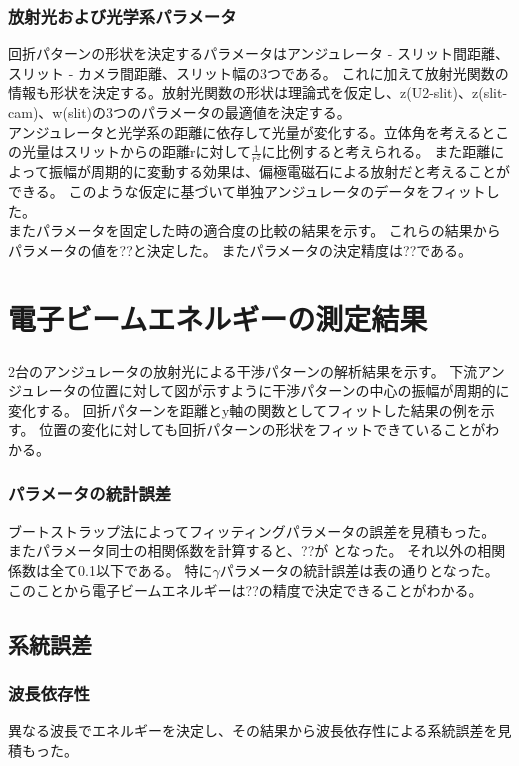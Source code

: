 \documentclass[a4paper,11pt,uplatex]{jsbook}
\begin{document}
\subsubsection{放射光および光学系パラメータ}
回折パターンの形状を決定するパラメータはアンジュレータ - スリット間距離、スリット - カメラ間距離、スリット幅の3つである。
これに加えて放射光関数の情報も形状を決定する。放射光関数の形状は理論式を仮定し、z(U2-slit)、z(slit-cam)、w(slit)の3つのパラメータの最適値を決定する。\\
アンジュレータと光学系の距離に依存して光量が変化する。立体角を考えるとこの光量はスリットからの距離rに対して$\frac{1}{r^2}$に比例すると考えられる。
また距離によって振幅が周期的に変動する効果は、偏極電磁石による放射だと考えることができる。
このような仮定に基づいて単独アンジュレータのデータをフィットした。\\
またパラメータを固定した時の適合度の比較の結果を示す。
これらの結果からパラメータの値を??と決定した。
またパラメータの決定精度は??である。
\section{電子ビームエネルギーの測定結果}
\subsubsection{}
2台のアンジュレータの放射光による干渉パターンの解析結果を示す。
下流アンジュレータの位置に対して図が示すように干渉パターンの中心の振幅が周期的に変化する。
回折パターンを距離とy軸の関数としてフィットした結果の例を示す。
位置の変化に対しても回折パターンの形状をフィットできていることがわかる。
\subsubsection{パラメータの統計誤差}
ブートストラップ法によってフィッティングパラメータの誤差を見積もった。
またパラメータ同士の相関係数を計算すると、??が となった。
それ以外の相関係数は全て0.1以下である。
特に$\gamma$パラメータの統計誤差は表の通りとなった。
このことから電子ビームエネルギーは??の精度で決定できることがわかる。
\subsection{系統誤差}
\subsubsection{波長依存性}
異なる波長でエネルギーを決定し、その結果から波長依存性による系統誤差を見積もった。
\end{document}
